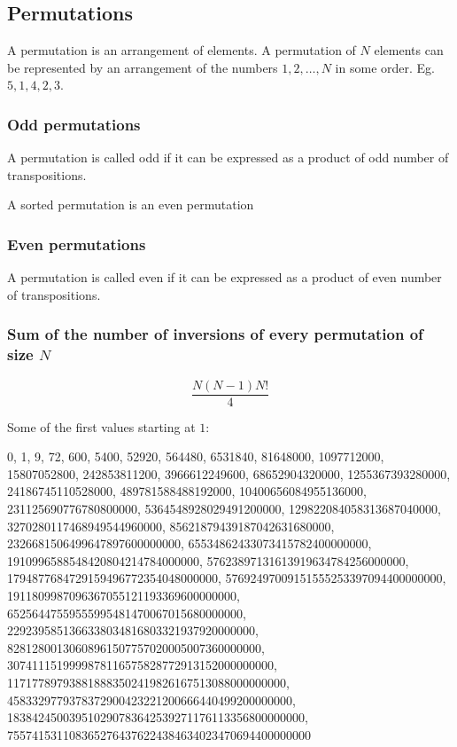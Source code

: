 \subsection{Permutations}

A permutation is an arrangement of elements. A permutation of $N$ elements can be represented by an arrangement of the numbers $1, 2, \dots, N$ in some order. Eg. $5, 1, 4, 2, 3$.

\subsubsection{Odd permutations}

A permutation is called odd if it can be expressed as a product of odd number of transpositions.

A sorted permutation is an even permutation

\subsubsection{Even permutations}

A permutation is called even if it can be expressed as a product of even number of transpositions.

\subsubsection{Sum of the number of inversions of every permutation of size $N$}

\begin{equation}
  \frac{N (N-1)  N!}{4}
\end{equation}

Some of the first values starting at $1$:

  0, 1, 9, 72, 600, 5400, 52920, 564480, 6531840, 81648000, 1097712000, 15807052800, 242853811200, 3966612249600, 68652904320000, 1255367393280000, 24186745110528000, 489781588488192000, 10400656084955136000, 231125690776780800000, 5364548928029491200000, 129822084058313687040000, 3270280117468949544960000, 85621879439187042631680000, 2326681506499647897600000000, 65534862433073415782400000000, 1910996588548420804214784000000, 57623897131613919634784256000000, 1794877684729159496772354048000000, 57692497009151555253397094400000000, 1911809987096367055121193369600000000, 65256447559555995481470067015680000000, 2292395851366338034816803321937920000000, 82812800130608961507757020005007360000000, 3074111519999878116575828772913152000000000, 117177897938818883502419826167513088000000000, 4583329779378372900423221200666440499200000000, 183842450039510290783642539271176113356800000000, 7557415311083652764376224384634023470694400000000


